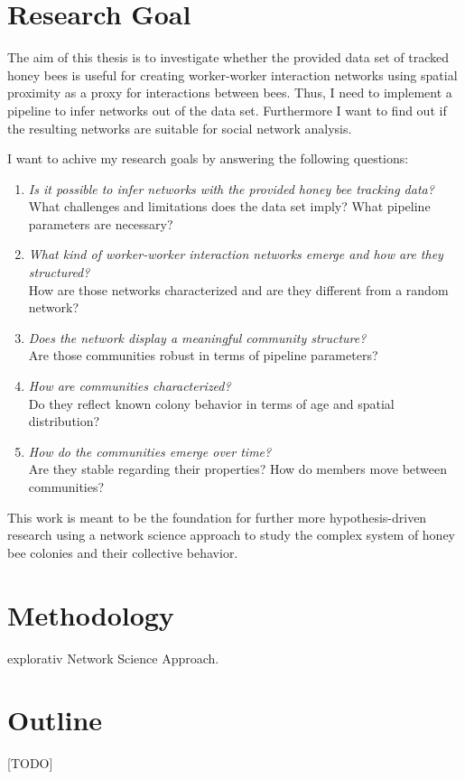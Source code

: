 \section{Research Goal}

The aim of this thesis is to investigate whether the provided data set of tracked honey bees is useful for creating worker-worker interaction networks using spatial proximity as a proxy for interactions between bees. Thus, I need to implement a pipeline to infer networks out of the data set. Furthermore I want to find out if the resulting networks are suitable for social network analysis.

I want to achive my research goals by answering the following questions:

\begin{enumerate}
\item \emph{Is it possible to infer networks with the provided honey bee tracking data?}\\
What challenges and limitations does the data set imply? What pipeline parameters are necessary?
\item \emph{What kind of worker-worker interaction networks emerge and how are they structured?}\\
How are those networks characterized and are they different from a random network?
\item \emph{Does the network display a meaningful community structure?}\\
Are those communities robust in terms of pipeline parameters?
\item \emph{How are communities characterized?}\\
Do they reflect known colony behavior in terms of age and spatial distribution?
\item \emph{How do the communities emerge over time?}\\
Are they stable regarding their properties? How do members move between communities?
\end{enumerate}

This work is meant to be the foundation for further more hypothesis-driven research using a network science approach to study the complex system of honey bee colonies and their collective behavior.

\section{Methodology}
explorativ
Network Science Approach.

\section{Outline}
[TODO]